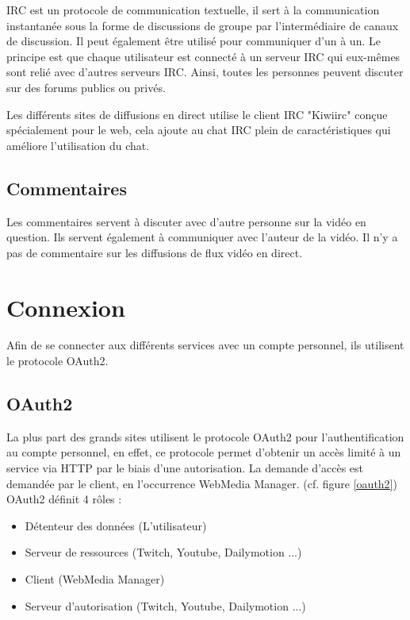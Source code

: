 \documentclass[11pt]{report} %
\begin{document}
		IRC est un protocole de communication textuelle, il sert à la communication instantanée sous la forme de discussions de groupe par l'intermédiaire de canaux de discussion. Il peut également être utilisé pour communiquer d'un à un.
		Le principe est que chaque utilisateur est connecté à un serveur IRC qui eux-mêmes sont relié avec d'autres serveurs IRC. Ainsi, toutes les personnes peuvent discuter sur des forums publics ou privés.
		
		Les différents sites de diffusions en direct utilise le client IRC "Kiwiirc" conçue spécialement pour le web, cela ajoute au chat IRC plein de caractéristiques qui améliore l'utilisation du chat.
		
		\subsection{Commentaires}
		Les commentaires servent à discuter avec d'autre personne sur la vidéo en question. Ils servent également à communiquer avec l'auteur de la vidéo.
		Il n'y a pas de commentaire sur les diffusions de flux vidéo en direct.
		
	\newpage
	\section{Connexion}
	Afin de se connecter aux différents services avec un compte personnel, ils utilisent le protocole OAuth2.
		\subsection{OAuth2}
		\label{sectionOauth2}
		La plus part des grands sites utilisent le protocole OAuth2 pour l'authentification au compte personnel, en effet, ce protocole permet d'obtenir un accès limité à un service via HTTP par le biais d'une autorisation. 
		La demande d'accès est demandée par le client, en l'occurrence WebMedia Manager.
		(cf. figure \ref{oauth2})\\
		OAuth2 définit 4 rôles :
		\begin{itemize}
			\item Détenteur des données (L'utilisateur)
			\item Serveur de ressources (Twitch, Youtube, Dailymotion ...)
			\item Client (WebMedia Manager)
			\item Serveur d'autorisation (Twitch, Youtube, Dailymotion ...)
		\end{itemize}
		
\end{document}
